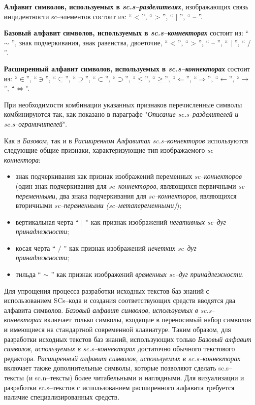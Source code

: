 \textbf{Алфавит символов, используемых в \textit{sc.s--разделителях}}, изображающих связь инцидентности sc--элементов состоит из: `` < ''{}, `` > ''{}, `` | ''{}, `` -- ''{}.

\textbf{Базовый алфавит символов, используемых в \textit{sc.s--коннекторах}} состоит из: `` $\sim$ ''{}, знак подчеркивания, знак равенства, двоеточие, `` < ''{}, `` > ''{}, `` -- ''{}, `` | ''{}, `` / ''{}.
	
\textbf{Расширенный алфавит символов, используемых в \textit{sc.s--коннекторах}} состоит из:
	``$\in$''{}, 
	``$\ni$''{}, ``$\subseteq$''{}, ``$\supseteq$''{},   ``$\subset$''{}, ``$\supset$''{}, ``$\leq$''{},  ``$\geq$''{}, ``$\Leftarrow$''{}, ``$\Rightarrow$''{}, ``$\leftarrow$''{}, ``$\rightarrow$''{}, 
	``$\Leftrightarrow$''{}.

При необходимости комбинации указанных признаков перечисленные символы комбинируются так, как показано в параграфе "\textit{Описание sc.s--разделителей и sc.s--ограничителей}"{}.

 Как в \textit{Базовом}, так и в \textit{Расширенном Алфавитах} \textit{sc.s--коннекторов} используются следующие общие признаки, характеризующие тип изображаемого \textit{sc--коннектора}:
\begin{itemize}
	\item знак подчеркивания как признак изображений переменных \textit{sc--коннекторов} (один знак подчеркивания для \textit{sc--коннекторов}, являющихся первичными \textit{sc--переменными}, два знака подчеркивания для \textit{sc--коннекторов}, являющихся вторичными \textit{sc--переменными (sc--метапеременными)});
	\item вертикальная черта `` $ | $ ''{} как признак изображений \textit{негативных sc--дуг принадлежности}; 
	\item косая черта `` $ / $ ''{} как признак изображений \textit{нечетких sc--дуг принадлежности};
	\item тильда `` $ \sim $ ''{} как признак изображений \textit{временных sc--дуг принадлежности}.   
\end{itemize}

Для упрощения процесса разработки исходных текстов баз знаний с использованием SCs--кода и создания соответствующих средств вводятся два алфавита символов. \textit{Базовый алфавит символов, используемых в sc.s--коннекторах} включает только символы, входящие в переносимый набор символов и имеющиеся на стандартной современной клавиатуре. Таким образом, для разработки исходных текстов баз знаний, использующих только \textit{Базовый алфавит символов, используемых в sc.s--коннекторах} достаточно обычного текстового редактора. \textit{Расширенный алфавит символов, используемых в sc.s--коннекторах} включает также дополнительные символы, которые позволяют сделать sc.s--тексты (и sc.n--тексты) более читабельными и наглядными. Для визуализации и разработки sc.s--текстов с использованием расширенного алфавита требуется наличие специализированных средств.



